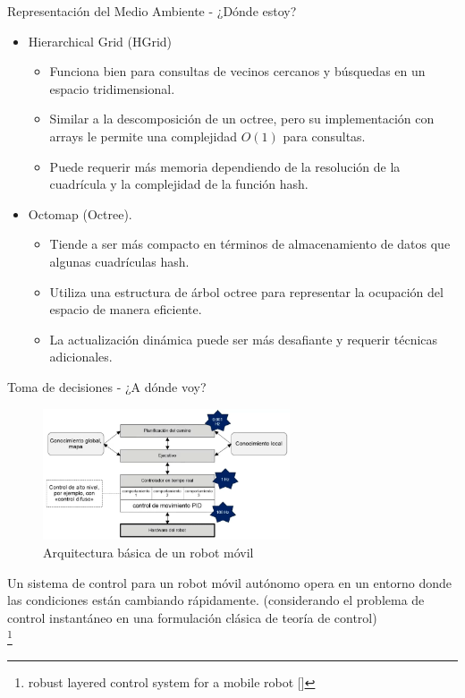 \documentclass[
  24pt, %
  aspectratio=169, %
]{beamer}
\begin{document}
\begin{frame}{Representación del Medio Ambiente - ¿Dónde estoy?}

  \begin{itemize}
  \item Hierarchical Grid (HGrid)
    \begin{itemize}
    \item Funciona bien para consultas de vecinos cercanos y búsquedas en un espacio tridimensional.
    \item Similar a la descomposición de un octree, pero su implementación con arrays le permite una complejidad $O(1)$ para consultas.
    \item Puede requerir más memoria dependiendo de la resolución de la cuadrícula y la complejidad de la función hash.
    \end{itemize}
  \item Octomap (Octree).
    \begin{itemize}
    \item Tiende a ser más compacto en términos de almacenamiento de datos que algunas cuadrículas hash.
    \item Utiliza una estructura de árbol octree para representar la ocupación del espacio de manera eficiente.
    \item La actualización dinámica puede ser más desafiante y requerir técnicas adicionales.
    \end{itemize}
  \end{itemize}  
\end{frame}

\begin{frame}{Toma de decisiones - ¿A dónde voy?}
  \begin{figure}[h]
    \includegraphics[width=0.65\textwidth]{arq_basica}
    \caption{Arquitectura básica de un robot móvil}
  \end{figure}
  \bigskip %
  \tiny Un sistema de control para un robot móvil autónomo opera en un entorno donde las condiciones están cambiando rápidamente. (considerando el problema de control instantáneo en una formulación clásica de teoría de control) \\\footnote{{\tiny robust layered control system for a mobile robot [\cite{brooks_robot}]}}
  
\end{frame}
\end{document}
